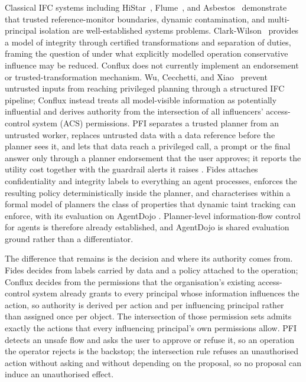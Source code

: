 \documentclass[11pt]{article}
\begin{document}
Classical IFC systems
including HiStar~\citep{histar}, Flume~\citep{flume}, and
Asbestos~\citep{asbestos} demonstrate that trusted reference-monitor
boundaries, dynamic contamination, and multi-principal isolation are
well-established systems problems. Clark-Wilson~\citep{clarkwilson} provides
a model of integrity through certified transformations and separation of
duties, framing the question of under what explicitly modelled operation
conservative influence may be reduced. Conflux does not currently
implement an endorsement or trusted-transformation mechanism.
Wu, Cecchetti, and Xiao~\citep{fsecure} prevent untrusted inputs from
reaching privileged planning through a structured IFC pipeline; Conflux
instead treats all model-visible information as potentially influential and
derives authority from the intersection of all influencers' access-control
system (ACS) permissions.
PFI separates a trusted planner from an untrusted worker, replaces untrusted
data with a data reference before the planner sees it, and lets that data reach
a privileged call, a prompt or the final answer only through a planner
endorsement that the user approves; it reports the utility cost together with
the guardrail alerts it raises \citep{pfi}. Fides attaches confidentiality and
integrity labels to everything an agent processes, enforces the resulting policy
deterministically inside the planner, and characterises within a formal model of
planners the class of properties that dynamic taint tracking can enforce, with
its evaluation on AgentDojo \citep{fides}. Planner-level information-flow
control for agents is therefore already established, and AgentDojo is shared
evaluation ground rather than a differentiator.

The difference that remains is the decision and where its authority comes from.
Fides decides from labels carried by data and a policy attached to the
operation; Conflux decides from the permissions that the organisation's
existing access-control system already grants to every principal whose
information influences the action, so authority is derived per action and per
influencing principal rather than assigned once per object. The intersection of
those permission sets admits exactly the actions that every influencing
principal's own permissions allow. PFI detects an unsafe flow and asks the user
to approve or refuse it, so an operation the operator rejects is the backstop;
the intersection rule refuses an unauthorised action without asking and without
depending on the proposal, so no proposal can induce an unauthorised effect.
\end{document}
